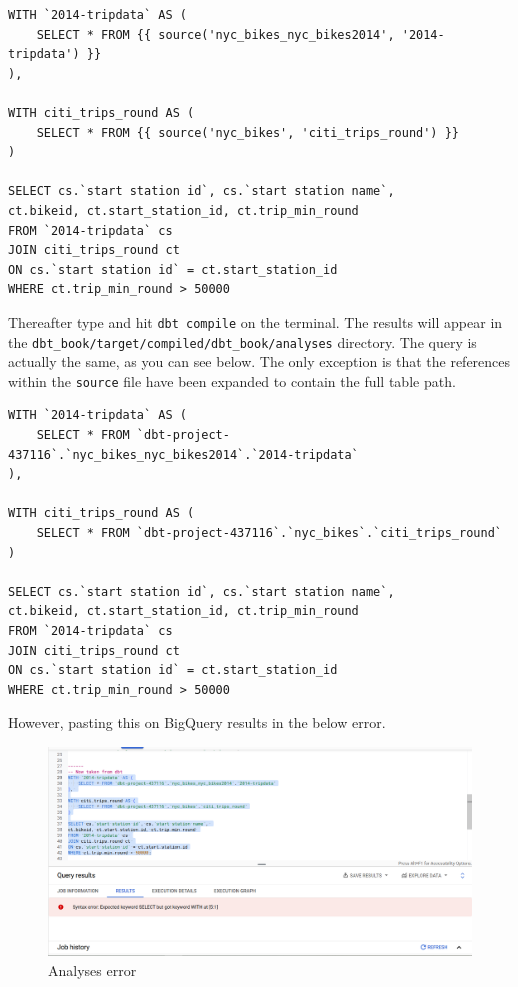 \documentclass[
]{book}
\begin{document}
\begin{verbatim}
WITH `2014-tripdata` AS (
    SELECT * FROM {{ source('nyc_bikes_nyc_bikes2014', '2014-tripdata') }}
), 

WITH citi_trips_round AS (
    SELECT * FROM {{ source('nyc_bikes', 'citi_trips_round') }}
)

SELECT cs.`start station id`, cs.`start station name`, 
ct.bikeid, ct.start_station_id, ct.trip_min_round 
FROM `2014-tripdata` cs 
JOIN citi_trips_round ct 
ON cs.`start station id` = ct.start_station_id
WHERE ct.trip_min_round > 50000
\end{verbatim}

Thereafter type and hit \texttt{dbt\ compile} on the terminal. The results will appear in the \texttt{dbt\_book/target/compiled/dbt\_book/analyses} directory. The query is actually the same, as you can see below. The only exception is that the references within the \texttt{source} file have been expanded to contain the full table path.

\begin{verbatim}
WITH `2014-tripdata` AS (
    SELECT * FROM `dbt-project-437116`.`nyc_bikes_nyc_bikes2014`.`2014-tripdata`
), 

WITH citi_trips_round AS (
    SELECT * FROM `dbt-project-437116`.`nyc_bikes`.`citi_trips_round`
)

SELECT cs.`start station id`, cs.`start station name`, 
ct.bikeid, ct.start_station_id, ct.trip_min_round 
FROM `2014-tripdata` cs 
JOIN citi_trips_round ct 
ON cs.`start station id` = ct.start_station_id
WHERE ct.trip_min_round > 50000
\end{verbatim}

However, pasting this on BigQuery results in the below error.

\begin{figure}
\centering
\includegraphics{./images/analyses_error.png}
\caption{Analyses error}
\end{figure}
\end{document}
